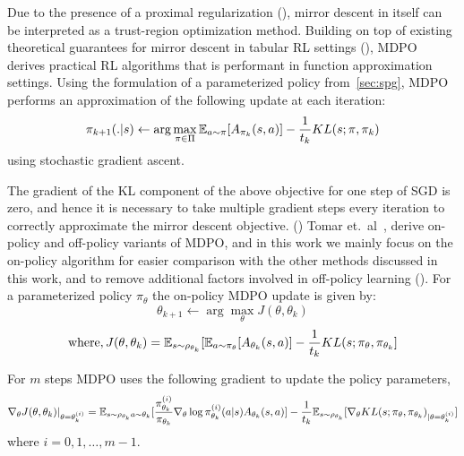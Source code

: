 Due to the presence of a proximal regularization (), mirror
descent in itself can be interpreted as a trust-region optimization method.
Building on top of existing theoretical guarantees for mirror descent in tabular RL settings
(), MDPO
derives practical RL algorithms that is performant in function approximation settings.
Using the formulation of a parameterized policy from~\ref{sec:spg}, MDPO performs an approximation
of the following update at each iteration:
\begin{equation}
	\label{eqn:mdrl} \pi_{k+1}(.
	|s) \leftarrow \arg
	\max_{\pi \in \Pi}
	\mathbb{E}_{a \sim \pi} [A_{\pi_k}(s,a)] -
	\frac{1}{t_k}
	KL(s; \pi, \pi_k)
\end{equation} using stochastic gradient ascent.

The gradient of the KL component of the above objective for one step of SGD is zero, and hence it
is necessary to take multiple gradient steps every iteration to correctly approximate the mirror
descent objective.
()
Tomar et.~al~\cite{tomarMirror2022}, derive on-policy and off-policy variants of MDPO, and in this
work we mainly focus on the on-policy algorithm for easier comparison with the other methods discussed in this work,
and to remove additional factors involved in off-policy learning ().
For a parameterized policy $ \pi_{\theta}$ the on-policy MDPO update is given by: $$ \theta_{k+1}
	\leftarrow \arg \max_{\theta} J(\theta, \theta_k)$$ $$ \text{where}, J(\theta, \theta_k) = \mathbb{E}_{s
		\sim \rho_{\theta_k}} [ \mathbb{E}_{a \sim \pi_\theta}[A_{\theta_k}(s,a)] - \frac{1}{t_k} KL(s; \pi_\theta,
		\pi_{\theta_k}]$$

For $m$ steps MDPO uses the following gradient to update the
policy parameters,
\begin{equation}
	\label{eqn:mdpograd} \nabla_{\theta} J(\theta,
	\theta_k)|_{\theta = \theta_k^{(i)}} = \mathbb{E}_{s \sim \rho_{\theta_k} \\ a \sim \theta_k} [ \frac{
			\pi_{\theta_k}^{(i)}}{ \pi_{\theta_k}} \nabla_{\theta} \log \pi_{\theta_k}^{(i)} (a|s)
		A_{\theta_k}(s,a)] - \frac{1}{t_k} \mathbb{E}_{s \sim \rho_{\theta_k}} [\nabla_\theta KL(s; \pi_\theta,
		\pi_{\theta_k})_{|\theta= \theta_k^{(i)}}]
\end{equation} where $i=0,1,\ldots,m-1$.

